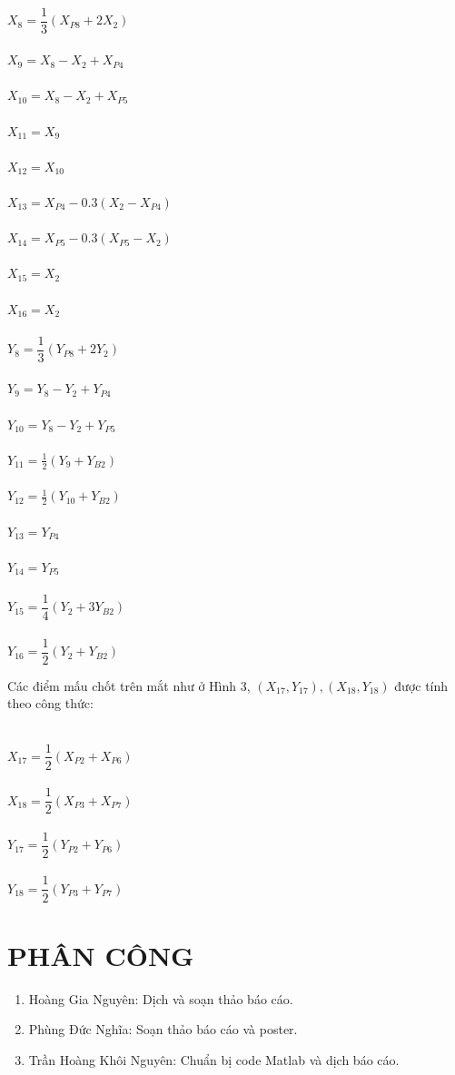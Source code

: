 \documentclass[conference]{IEEEtran}
\begin{document}
\begin{multicols}{2}
~\\
$X_8=\dfrac{1}{3}(X_{P8}+2X_2)$\\\\
$X_9=X_8-X_2+X_{P4}$\\\\
$X_{10}=X_8-X_2+X_{P5}$\\\\
$X_{11}=X_9$\\\\
$X_{12}=X_{10}$\\\\
$X_{13}=X_{P4}-0.3(X_2-X_{P4})$\\\\
$X_{14}=X_{P5}-0.3(X_{P5}-X_2)$\\\\
$X_{15}=X_{2}$\\\\
$X_{16}=X_{2}$
\columnbreak
~\\\\
$Y_8=\dfrac{1}{3}(Y_{P8}+2Y_2)$\\\\
$Y_9 = Y_8-Y_2+Y_{P4}$\\\\
$Y_{10}=Y_8-Y_2+Y_{P5}$\\\\
$Y_{11} = \frac{1}{2}(Y_9+Y_{B2})$\\\\
$Y_{12} = \frac{1}{2}(Y_{10}+Y_{B2})$\\\\
$Y_{13} = Y_{P4}$\\\\
$Y_{14} = Y_{P5}$\\\\
$Y_{15} = \dfrac{1}{4}(Y_{2}+3Y_{B2})$\\\\
$Y_{16} = \dfrac{1}{2}(Y_{2}+Y_{B2})$
\end{multicols}
Các điểm mấu chốt trên mắt như ở Hình 3, $(X_{17},Y_{17}),(X_{18},Y_{18})$ được tính theo công thức:
\begin{multicols}{2}
~\\
$X_{17}=\dfrac{1}{2}(X_{P2}+X_{P6})$\\\\
$X_{18}=\dfrac{1}{2}(X_{P3}+X_{P7})$
\columnbreak
~\\\\
$Y_{17}=\dfrac{1}{2}(Y_{P2}+Y_{P6})$\\\\
$Y_{18}=\dfrac{1}{2}(Y_{P3}+Y_{P7})$
\end{multicols}
\section{PHÂN CÔNG}
\begin{enumerate}
	\item Hoàng Gia Nguyên: Dịch và soạn thảo báo cáo.
	\item Phùng Đức Nghĩa: Soạn thảo báo cáo và poster.
	\item Trần Hoàng Khôi Nguyên: Chuẩn bị code Matlab và dịch báo cáo.
\end{enumerate}
\end{document}
